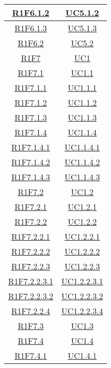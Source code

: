 \begin{longtable}{|c|c|}
\hline
\hyperlink{R1F6.1.2}{R1F6.1.2} & \hyperlink{UC5.1.2}{UC5.1.2}\\
\hline
\hyperlink{R1F6.1.3}{R1F6.1.3} & \hyperlink{UC5.1.3}{UC5.1.3}\\
\hline
\hyperlink{R1F6.2}{R1F6.2} & \hyperlink{UC5.2}{UC5.2}\\
\hline
\hyperlink{R1F7}{R1F7} & \hyperlink{UC1}{UC1}\\
\hline
\hyperlink{R1F7.1}{R1F7.1} & \hyperlink{UC1.1}{UC1.1}\\
\hline
\hyperlink{R1F7.1.1}{R1F7.1.1} & \hyperlink{UC1.1.1}{UC1.1.1}\\
\hline
\hyperlink{R1F7.1.2}{R1F7.1.2} & \hyperlink{UC1.1.2}{UC1.1.2}\\
\hline
\hyperlink{R1F7.1.3}{R1F7.1.3} & \hyperlink{UC1.1.3}{UC1.1.3}\\
\hline
\hyperlink{R1F7.1.4}{R1F7.1.4} & \hyperlink{UC1.1.4}{UC1.1.4}\\
\hline
\hyperlink{R1F7.1.4.1}{R1F7.1.4.1} & \hyperlink{UC1.1.4.1}{UC1.1.4.1}\\
\hline
\hyperlink{R1F7.1.4.2}{R1F7.1.4.2} & \hyperlink{UC1.1.4.2}{UC1.1.4.2}\\
\hline
\hyperlink{R1F7.1.4.3}{R1F7.1.4.3} & \hyperlink{UC1.1.4.3}{UC1.1.4.3}\\
\hline
\hyperlink{R1F7.2}{R1F7.2} & \hyperlink{UC1.2}{UC1.2}\\
\hline
\hyperlink{R1F7.2.1}{R1F7.2.1} & \hyperlink{UC1.2.1}{UC1.2.1}\\
\hline
\hyperlink{R1F7.2.2}{R1F7.2.2} & \hyperlink{UC1.2.2}{UC1.2.2}\\
\hline
\hyperlink{R1F7.2.2.1}{R1F7.2.2.1} & \hyperlink{UC1.2.2.1}{UC1.2.2.1}\\
\hline
\hyperlink{R1F7.2.2.2}{R1F7.2.2.2} & \hyperlink{UC1.2.2.2}{UC1.2.2.2}\\
\hline
\hyperlink{R1F7.2.2.3}{R1F7.2.2.3} & \hyperlink{UC1.2.2.3}{UC1.2.2.3}\\
\hline
\hyperlink{R1F7.2.2.3.1}{R1F7.2.2.3.1} & \hyperlink{UC1.2.2.3.1}{UC1.2.2.3.1}\\
\hline
\hyperlink{R1F7.2.2.3.2}{R1F7.2.2.3.2} & \hyperlink{UC1.2.2.3.2}{UC1.2.2.3.2}\\
\hline
\hyperlink{R1F7.2.2.4}{R1F7.2.2.4} & \hyperlink{UC1.2.2.4}{UC1.2.2.3.4}\\
\hline
\hyperlink{R1F7.3}{R1F7.3} & \hyperlink{UC1.3}{UC1.3}\\
\hline
\hyperlink{R1F7.4}{R1F7.4} & \hyperlink{UC1.4}{UC1.4}\\
\hline
\hyperlink{R1F7.4.1}{R1F7.4.1} & \hyperlink{UC1.4.1}{UC1.4.1}\\

\end{longtable}
